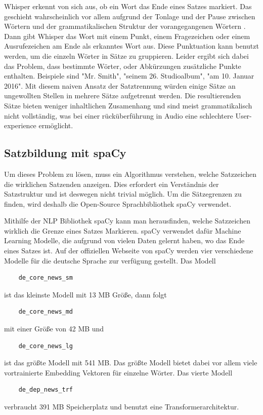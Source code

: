 Whisper erkennt von sich aus, ob ein Wort das Ende eines Satzes markiert.
Das geschieht wahrscheinlich vor allem aufgrund der Tonlage und der Pause zwischen Wörtern und der grammatikalischen Struktur der vorangegangenen Wörtern \cite{biron2021} \cite{radford}.
Dann gibt Whisper das Wort mit einem Punkt, einem Fragezeichen oder einem Ausrufezeichen am Ende als erkanntes Wort aus.
Diese Punktuation kann benutzt werden, um die einzeln Wörter in Sätze zu gruppieren.
Leider ergibt sich dabei das Problem, dass bestimmte Wörter, oder Abkürzungen zusätzliche Punkte enthalten.
Beispiele sind "Mr. Smith", "seinem 26. Studioalbum", "am 10. Januar 2016".
Mit diesem naiven Ansatz der Satztrennung würden einige Sätze an ungewollten Stellen in mehrere Sätze aufgetrennt werden.
Die resultierenden Sätze bieten weniger inhaltlichen Zusamenhang und sind meist grammatikalisch nicht vollständig, was bei einer rücküberführung in Audio eine schlechtere User-experience ermöglicht.


\subsection{Satzbildung mit spaCy}

Um dieses Problem zu lösen, muss ein Algorithmus verstehen, welche Satzzeichen die wirklichen Satzenden anzeigen.
Dies erfordert ein Verständnis der Satzstruktur und ist deswegen nicht trivial möglich.
Um die Sätzegrenzen zu finden, wird deshalb die Open-Source Sprachbibliothek spaCy verwendet.\cite{honnibal2017}

Mithilfe der NLP Bibliothek spaCy kann man herausfinden, welche Satzzeichen wirklich die Grenze eines Satzes Markieren.
spaCy verwendet dafür Machine Learning Modelle, die aufgrund von vielen Daten gelernt haben, wo das Ende eines Satzes ist.
Auf der offiziellen Webseite von spaCy werden vier verschiedene Modelle für die deutsche Sprache zur verfügung gestellt.
Das Modell 
\begin{verbatim}
    de_core_news_sm 
\end{verbatim} 
ist das kleinste Modell mit 13 MB Größe, dann folgt 
\begin{verbatim} 
    de_core_news_md 
\end{verbatim}
mit einer Größe von 42 MB und 
\begin{verbatim}
    de_core_news_lg 
\end{verbatim}
ist das größte Modell mit 541 MB.
Das größte Modell bietet dabei vor allem viele vortrainierte Embedding Vektoren für einzelne Wörter.
Das vierte Modell 
\begin{verbatim}
    de_dep_news_trf
\end{verbatim}
verbraucht 391 MB Speicherplatz und benutzt eine Transformerarchitektur.

